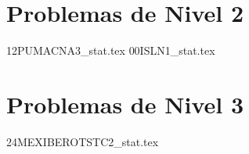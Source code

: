 \section{Problemas de Nivel 2}
{12PUMACNA3_stat.tex} %
{00ISLN1_stat.tex} %

\section{Problemas de Nivel 3}
{24MEXIBEROTSTC2_stat.tex} %